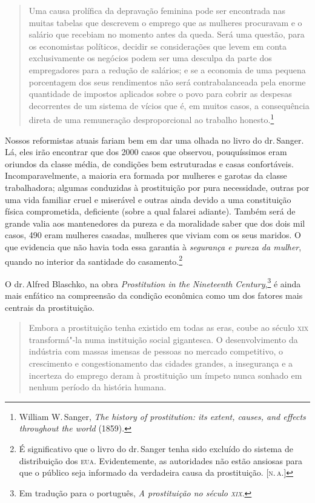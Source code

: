 \begin{quote}
Uma causa prolífica da depravação feminina pode ser encontrada nas
muitas tabelas que descrevem o emprego que as mulheres procuravam e o
salário que recebiam no momento antes da queda. Será uma questão, para
os economistas políticos, decidir se considerações que levem em conta
exclusivamente os negócios podem ser uma desculpa da parte dos
empregadores para a redução de salários; e se a economia de uma pequena
porcentagem dos seus rendimentos não será contrabalanceada pela enorme
quantidade de impostos aplicados sobre o povo para cobrir as despesas
decorrentes de um sistema de vícios que é, em muitos casos, a
consequência direta de uma remuneração desproporcional ao trabalho
honesto.\footnote{William W.\,Sanger, \textit{The history of
  prostitution: its extent, causes, and effects throughout the world}
  (1859).}
  \end{quote}

Nossos reformistas atuais fariam bem em dar uma olhada no livro do dr.\,Sanger. Lá, eles irão encontrar que dos 2000 casos que observou,
pouquíssimos eram oriundos da classe média, de condições bem
estruturadas e casas confortáveis. Incomparavelmente, a maioria era
formada por mulheres e garotas da classe trabalhadora; algumas
conduzidas à prostituição por pura necessidade, outras por uma vida
familiar cruel e miserável e outras ainda devido a uma constituição
física comprometida, deficiente (sobre a qual falarei adiante). Também
será de grande valia aos mantenedores da pureza e da moralidade saber
que dos dois mil casos, 490 eram mulheres casadas, mulheres que viviam com
os seus maridos. O que evidencia que não havia toda essa garantia à
\textit{segurança e pureza da mulher}, quando no interior da santidade do
casamento.\footnote{É significativo que o livro do dr.\,Sanger tenha sido
  excluído do sistema de distribuição dos \textsc{eua}. Evidentemente, as
  autoridades não estão ansiosas para que o público seja informado da
  verdadeira causa da prostituição. [\textsc{n.\,a.}]}

O dr.\,Alfred Blaschko, na obra \textit{Prostitution in the Nineteenth Century},\footnote{Em tradução para o português,  \textit{A prostituição no século \textsc{xix}}.} é ainda mais
enfático na compreensão da condição econômica como um dos fatores mais
centrais da prostituição.

\begin{quote}
Embora a prostituição tenha existido em todas as eras, coube ao século
\textsc{xix} transformá"-la numa instituição social gigantesca. O desenvolvimento
da indústria com massas imensas de pessoas no mercado competitivo, o
crescimento e congestionamento das cidades grandes, a insegurança e a
incerteza do emprego deram à prostituição um ímpeto nunca sonhado em
nenhum período da história humana.
\end{quote}


